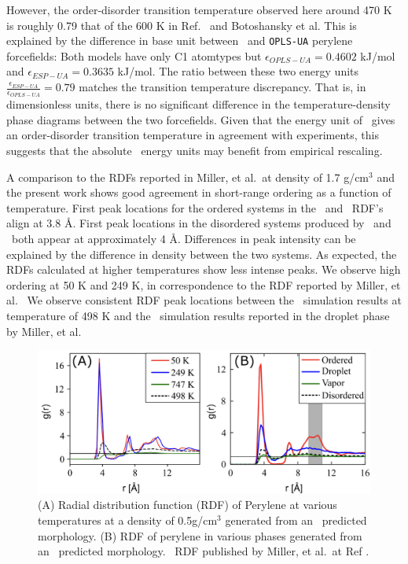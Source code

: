 However, the order-disorder transition temperature observed here around 470 K is roughly 0.79 that of the 600 K in Ref.~\citep{miller_enhanced_2017} and Botoshansky et al\cite{botoshansky2003towards}.
This is explained by the difference in base unit between \esp~and \texttt{OPLS-UA} perylene forcefields: Both models have only C1 atomtypes but $\epsilon_{OPLS-UA}=0.4602$ kJ/mol and $\epsilon_{ESP-UA}=0.3635$ kJ/mol. 
The ratio between these two energy units $\frac{\epsilon_{ESP-UA}}{\epsilon_{OPLS-UA}}=0.79$ matches the transition temperature discrepancy.
That is, in dimensionless units, there is no significant difference in the temperature-density phase diagrams between the two forcefields.
Given that the energy unit of \oplsff~gives an order-disorder transition temperature in agreement with experiments, this suggests that the absolute \espff~energy units may benefit from empirical rescaling.

A comparison to the RDFs reported in Miller, et al.~at density of 1.7 g/cm$^3$ and the present work shows good agreement in short-range ordering as a function of temperature.
 First peak locations for the ordered systems in the \espff~and \oplsff~RDF's align at 3.8 \AA. 
 First peak locations in the disordered systems produced by \espff~and \oplsff~both appear at approximately 4 \AA. 
 Differences in peak intensity can be explained by the difference in density between the two systems. 
 As expected, the RDFs calculated  at higher temperatures show less intense peaks. 
 We observe high ordering at 50 K and 249 K, in correspondence to the RDF reported by Miller, et al.~
 We observe consistent RDF peak locations between the \espff~simulation results at temperature of 498 K and the \oplsff~simulation results reported in the droplet phase by Miller, et al.~ 
\begin{figure}[h!]
    \centering
    \includegraphics[width=.75\textwidth]{src/figures/FF_figs/per_rdf.png}
    \caption{(A) Radial distribution function (RDF) of Perylene at various temperatures at a density of 0.5g/cm$^3$ generated from an \espff~predicted morphology. (B) RDF of perylene in various phases generated from an \oplsff~predicted morphology. \oplsff~RDF published by Miller, et al.~at Ref \citep{miller_enhanced_2017}.}
    \label{per_rdf}
\end{figure}


